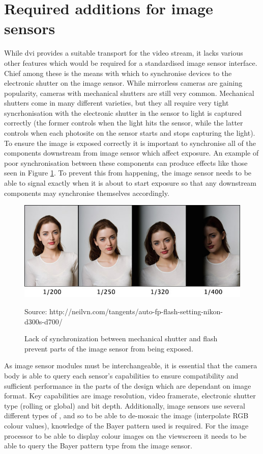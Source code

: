 \section{Required additions for image sensors}

While \gls{dvi} provides a suitable transport for the video stream, it lacks various other features which would be required for a standardised image sensor interface. Chief among these is the means with which to synchronise devices to the electronic shutter on the image sensor. While mirrorless cameras are gaining popularity, cameras with mechanical shutters are still very common. Mechanical shutters come in many different varieties, but they all require very tight syncrhonisation with the electronic shutter in the sensor to light is captured correctly (the former controls when the light hits the sensor, while the latter controls when each photosite on the sensor starts and stops capturing the light). To ensure the image is exposed correctly it is important to synchronise all of the components downstream from image sensor which affect exposure. An example of poor synchronisation between these components can produce effects like those seen in Figure \ref{fig:flash_unsync}. To prevent this from happening, the image sensor needs to be able to signal exactly when it is about to start exposure so that any downstream components may synchronise themselves accordingly.

\begin{figure}
  \centering
  \includegraphics[width=1\textwidth]{./img/flash_unsync.jpg}\par
Source: http://neilvn.com/tangents/auto-fp-flash-setting-nikon-d300s-d700/ 
  \caption{Lack of synchronization between mechanical shutter and flash prevent parts of the image sensor from being exposed.}
  \label{fig:flash_unsync}
\end{figure}

As image sensor modules must be interchangeable, it is essential that the camera body is able to query each sensor's capabilities to ensure compatibility and sufficient performance in the parts of the design which are dependant on image format. Key capabilities are image resolution, video framerate, electronic shutter type (rolling or global) and bit depth. Additionally, image sensors use several different types of , and so to be able to de-mosaic the image (interpolate RGB colour values), knowledge of the Bayer pattern used is required. For the image processor to be able to display colour images on the viewscreen it needs to be able to query the Bayer pattern type from the image sensor. 
 
